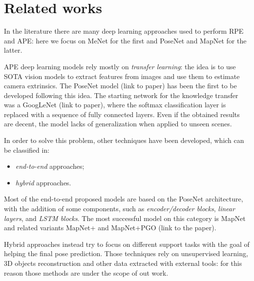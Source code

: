 \section{Related works}
In the literature there are many deep learning approaches used to perform RPE and APE: here we focus on MeNet for the first and PoseNet and MapNet for the latter.

APE deep learning models rely mostly on \emph{transfer learning}: the idea is to use SOTA vision models to extract features from images and use them to estimate camera extrinsics.
The PoseNet model (link to paper) has been the first to be developed following this idea. The starting network for the knowledge transfer was a GoogLeNet (link to paper), where the softmax classification layer is replaced with a sequence of fully connected layers. Even if the obtained results are decent, the model lacks of generalization when applied to unseen scenes.

In order to solve this problem, other techniques have been developed, which can be classified in:
\begin{itemize}
    \item \emph{end-to-end} approaches;
    \item \emph{hybrid} approaches.
\end{itemize}

Most of the end-to-end proposed models are based on the PoseNet architecture, with the addition of some components, such as \emph{encoder/decoder blocks}, \emph{linear layers}, and \emph{LSTM blocks}. The most successful model on this category is MapNet and related variants MapNet+ and MapNet+PGO (link to the paper).

Hybrid approaches instead try to focus on different support tasks with the goal of helping the final pose prediction. Those techniques rely on unsupervised learning, 3D objects reconstruction and other data extracted with external tools: for this reason those methods are under the scope of out work.
